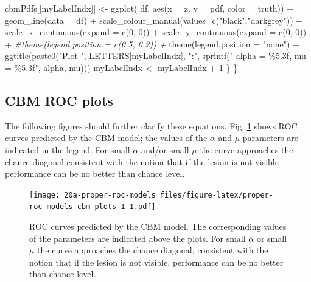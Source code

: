 \documentclass[
]{book}
\newenvironment{Shaded}{\begin{snugshade}}{\end{snugshade}}
\newcommand{\AttributeTok}[1]{\textcolor[rgb]{0.77,0.63,0.00}{#1}}
\newcommand{\CommentTok}[1]{\textcolor[rgb]{0.56,0.35,0.01}{\textit{#1}}}
\newcommand{\DecValTok}[1]{\textcolor[rgb]{0.00,0.00,0.81}{#1}}
\newcommand{\FunctionTok}[1]{\textcolor[rgb]{0.00,0.00,0.00}{#1}}
\newcommand{\NormalTok}[1]{#1}
\newcommand{\OtherTok}[1]{\textcolor[rgb]{0.56,0.35,0.01}{#1}}
\newcommand{\SpecialCharTok}[1]{\textcolor[rgb]{0.00,0.00,0.00}{#1}}
\newcommand{\StringTok}[1]{\textcolor[rgb]{0.31,0.60,0.02}{#1}}
\begin{document}
\begin{Shaded}
\begin{Highlighting}[]
\NormalTok{      cbmPdfs[[myLabelIndx]] }\OtherTok{\textless{}{-}} \FunctionTok{ggplot}\NormalTok{(}
\NormalTok{        df, }\FunctionTok{aes}\NormalTok{(}\AttributeTok{x =}\NormalTok{ z, }\AttributeTok{y =}\NormalTok{ pdf, }\AttributeTok{color =}\NormalTok{ truth)) }\SpecialCharTok{+}
        \FunctionTok{geom\_line}\NormalTok{(}\AttributeTok{data =}\NormalTok{ df) }\SpecialCharTok{+}
        \FunctionTok{scale\_colour\_manual}\NormalTok{(}\AttributeTok{values=}\FunctionTok{c}\NormalTok{(}\StringTok{"black"}\NormalTok{,}\StringTok{"darkgrey"}\NormalTok{)) }\SpecialCharTok{+}
        \FunctionTok{scale\_x\_continuous}\NormalTok{(}\AttributeTok{expand =} \FunctionTok{c}\NormalTok{(}\DecValTok{0}\NormalTok{, }\DecValTok{0}\NormalTok{)) }\SpecialCharTok{+}
        \FunctionTok{scale\_y\_continuous}\NormalTok{(}\AttributeTok{expand =} \FunctionTok{c}\NormalTok{(}\DecValTok{0}\NormalTok{, }\DecValTok{0}\NormalTok{)) }\SpecialCharTok{+}
        \CommentTok{\#theme(legend.position = c(0.5, 0.2)) +}
        \FunctionTok{theme}\NormalTok{(}\AttributeTok{legend.position =} \StringTok{"none"}\NormalTok{) }\SpecialCharTok{+}
        \FunctionTok{ggtitle}\NormalTok{(}\FunctionTok{paste0}\NormalTok{(}\StringTok{"Plot "}\NormalTok{, }
\NormalTok{                   LETTERS[myLabelIndx], }
                   \StringTok{":"}\NormalTok{, }
                   \FunctionTok{sprintf}\NormalTok{(}\StringTok{" alpha = \%5.3f, mu = \%5.3f"}\NormalTok{, }
\NormalTok{                           alpha, mu)))}
\NormalTok{      myLabelIndx }\OtherTok{\textless{}{-}}\NormalTok{ myLabelIndx }\SpecialCharTok{+} \DecValTok{1}
\NormalTok{    \}}
\NormalTok{  \}}
\end{Highlighting}
\end{Shaded}

\hypertarget{proper-roc-models-cbm-rocs}{%
\subsection{CBM ROC plots}\label{proper-roc-models-cbm-rocs}}

The following figures should further clarify these equations. Fig. \ref{fig:proper-roc-models-cbm-plots-1} shows ROC curves predicted by the CBM model; the values of the \(\alpha\) and \(\mu\) parameters are indicated in the legend. For small \(\alpha\) and/or small \(\mu\) the curve approaches the chance diagonal consistent with the notion that if the lesion is not visible performance can be no better than chance level.

\begin{figure}
\centering
\texttt{[image: 20a-proper-roc-models\_files/figure-latex/proper-roc-models-cbm-plots-1-1.pdf]}
\caption{\label{fig:proper-roc-models-cbm-plots-1}ROC curves predicted by the CBM model. The corresponding values of the parameters are indicated above the plots. For small \(\alpha\) or small \(\mu\) the curve approaches the chance diagonal, consistent with the notion that if the lesion is not visible, performance can be no better than chance level.}
\end{figure}
\end{document}
